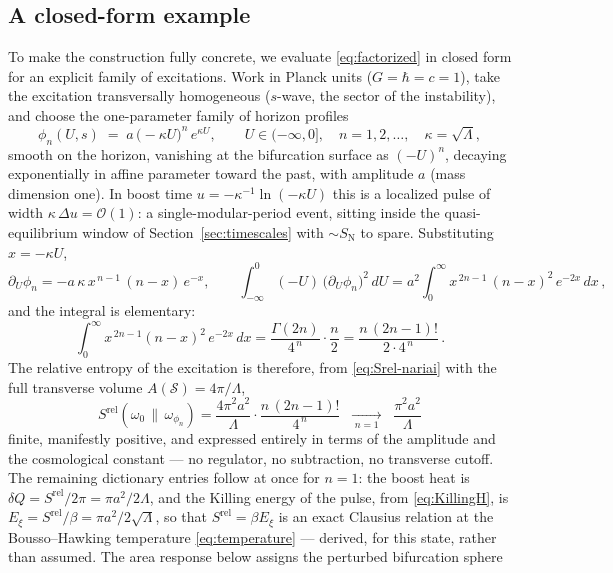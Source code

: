 \documentclass[11pt]{article}
\newcommand{\Srel}{S^{\mathrm{rel}}}
\begin{document}
\subsection{A closed-form example}
\label{sec:example}

To make the construction fully concrete, we evaluate \eqref{eq:factorized} in closed form for an explicit family of excitations. Work in Planck units ($G = \hbar = c = 1$), take the excitation transversally homogeneous ($s$-wave, the sector of the instability), and choose the one-parameter family of horizon profiles
\begin{equation}
\phi_n(U, s) \;=\; a\,\big(\!-\kappa U\big)^{n}\, e^{\kappa U},
\qquad U \in (-\infty, 0],
\quad n = 1, 2, \dots,
\quad \kappa = \sqrt{\Lambda},
\label{eq:example-profile}
\end{equation}
smooth on the horizon, vanishing at the bifurcation surface as $(-U)^n$, decaying exponentially in affine parameter toward the past, with amplitude $a$ (mass dimension one). In boost time $u = -\kappa^{-1}\ln(-\kappa U)$ this is a localized pulse of width $\kappa\,\Delta u = \mathcal{O}(1)$: a single-modular-period event, sitting inside the quasi-equilibrium window of Section~\ref{sec:timescales} with $\sim S_{\mathrm{N}}$ to spare. Substituting $x = -\kappa U$,
\begin{equation}
\partial_U \phi_n = -a\,\kappa\, x^{\,n-1}\,(n - x)\, e^{-x},
\qquad
\int_{-\infty}^{0} (-U)\,\big(\partial_U \phi_n\big)^2\, dU
= a^2 \int_0^\infty x^{\,2n-1}\, (n - x)^2\, e^{-2x}\, dx\,,
\end{equation}
and the integral is elementary:
\begin{equation}
\int_0^\infty x^{\,2n-1} (n-x)^2\, e^{-2x}\, dx
= \frac{\Gamma(2n)}{4^{\,n}}\cdot \frac{n}{2}
= \frac{n\,(2n-1)!}{2 \cdot 4^{\,n}}\,.
\end{equation}
The relative entropy of the excitation is therefore, from \eqref{eq:Srel-nariai} with the full transverse volume $A(\mathcal{S}) = 4\pi/\Lambda$,
\begin{equation}
\boxed{\;
\Srel(\omega_0\,\|\,\omega_{\phi_n})
= \frac{4\pi^2 a^2}{\Lambda}\cdot \frac{n\,(2n-1)!}{4^{\,n}}
\;\;\xrightarrow[\;n=1\;]{}\;\;
\frac{\pi^2 a^2}{\Lambda}
\;}
\label{eq:example-Srel}
\end{equation}
finite, manifestly positive, and expressed entirely in terms of the amplitude and the cosmological constant --- no regulator, no subtraction, no transverse cutoff. The remaining dictionary entries follow at once for $n = 1$: the boost heat is $\delta Q = \Srel/2\pi = \pi a^2 / 2\Lambda$, and the Killing energy of the pulse, from \eqref{eq:KillingH}, is $E_\xi = \Srel/\beta = \pi a^2/2\sqrt{\Lambda}$, so that $\Srel = \beta E_\xi$ is an exact Clausius relation at the Bousso--Hawking temperature \eqref{eq:temperature} --- derived, for this state, rather than assumed. The area response below assigns the perturbed bifurcation sphere
\end{document}
